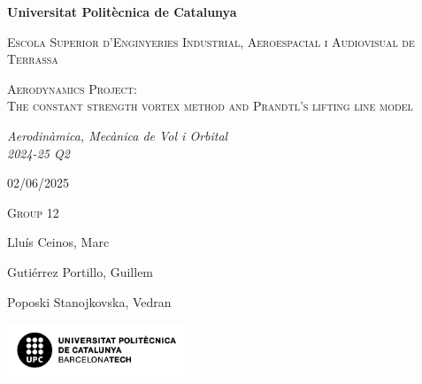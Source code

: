 \begin{titlepage}


\centering
{\bfseries\LARGE Universitat Politècnica de Catalunya\par}
{\scshape\Large Escola Superior d'Enginyeries Industrial, Aeroespacial i Audiovisual de Terrassa\par}
\vspace{2.5cm}
{\scshape\Huge Aerodynamics Project:  \\The constant strength vortex method and Prandtl's lifting line model
 \par}
\vspace{2cm}
{\itshape\Large Aerodinàmica, Mecànica de Vol i Orbital \\ 2024-25 Q2 \par}
\vspace{0.5cm}
{02/06/2025 \par}
\vspace{0.5cm}
{\scshape\Large Group 12  \par}
\vspace{0.2cm}

{\Large Lluís Ceinos, Marc \par}
{\Large Gutiérrez Portillo, Guillem \par}
{\Large Poposki Stanojkovska, Vedran \par}
\vspace{2.5cm}
\includegraphics[width=0.4\textwidth]{imatges/logo upc negre sobre blanc.png}


\end{titlepage}
\newpage